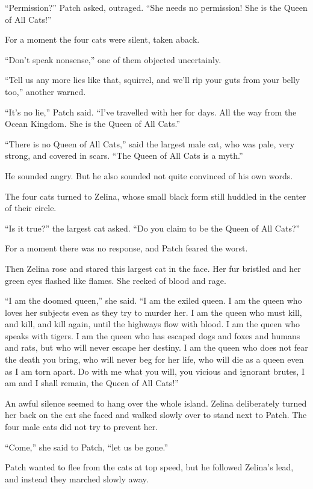 \documentclass[12pt]{memoir}
\begin{document}
“Permission?” Patch asked, outraged. “She needs no permission! She is
the Queen of All Cats!”

For a moment the four cats were silent, taken aback.

“Don’t speak nonsense,” one of them objected uncertainly.

“Tell us any more lies like that, squirrel, and we’ll rip your guts
from your belly too,” another warned.

“It’s no lie,” Patch said. “I’ve travelled with her for days. All the
way from the Ocean Kingdom. She is the Queen of All Cats.”

“There is no Queen of All Cats,” said the largest male cat, who was
pale, very strong, and covered in scars. “The Queen of All Cats is a
myth.”

He sounded angry. But he also sounded not quite convinced of his own
words.

The four cats turned to Zelina, whose small black form still huddled
in the center of their circle.

“Is it true?” the largest cat asked. “Do you claim to be the Queen of
All Cats?”

For a moment there was no response, and Patch feared the worst.

Then Zelina rose and stared this largest cat in the face. Her fur
bristled and her green eyes flashed like flames. She reeked of blood
and rage.

“I am the doomed queen,” she said. “I am the exiled queen. I am the
queen who loves her subjects even as they try to murder her. I am the
queen who must kill, and kill, and kill again, until the highways flow
with blood. I am the queen who speaks with tigers. I am the queen who
has escaped dogs and foxes and humans and rats, but who will never
escape her destiny. I am the queen who does not fear the death you
bring, who will never beg for her life, who will die as a queen even
as I am torn apart. Do with me what you will, you vicious and ignorant
brutes, I am and I shall remain, the Queen of All Cats!”

An awful silence seemed to hang over the whole island. Zelina
deliberately turned her back on the cat she faced and walked slowly
over to stand next to Patch. The four male cats did not try to prevent
her.

“Come,” she said to Patch, “let us be gone.”

Patch wanted to flee from the cats at top speed, but he followed
Zelina’s lead, and instead they marched slowly away.
\end{document}
